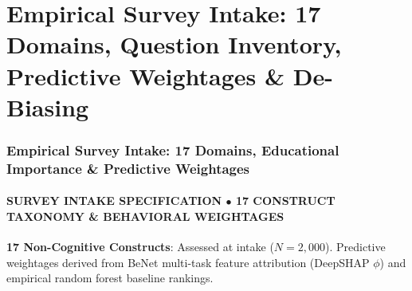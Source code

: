 \documentclass[aspectratio=169, 10pt]{beamer}
\begin{document}
\section{Empirical Survey Intake: 17 Domains, Question Inventory, Predictive Weightages \& De-Biasing}

\begin{frame}
  \frametitle{Empirical Survey Intake: 17 Domains, Educational Importance \& Predictive Weightages}
  \framesubtitle{SURVEY INTAKE SPECIFICATION $\bullet$ 17 CONSTRUCT TAXONOMY \& BEHAVIORAL WEIGHTAGES}

  \begin{topsummarybar}
    \fontsize{6.5pt}{7.8pt}\selectfont
    \textbf{\color{NavyDark}17 Non-Cognitive Constructs}: Assessed at intake ($N=2,000$). Predictive weightages derived from BeNet multi-task feature attribution (DeepSHAP $\phi$) and empirical random forest baseline rankings.
  \end{topsummarybar}
  \vspace{-0.30cm}


\end{frame}
\end{document}
